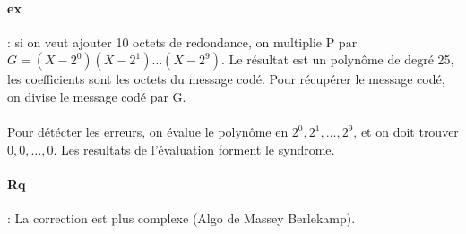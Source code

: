 \documentclass[10pt,a4paper]{article}
\begin{document}
	\paragraph{ex}: si on veut ajouter 10 octets de redondance, on multiplie P par $G = (X-2^0)(X-2^1)\ldots (X-2^9)$. Le résultat est un polynôme de degré 25, les coefficients sont les octets du message codé. Pour récupérer le message codé, on divise le message codé par G.
	\paragraph{} Pour détécter les erreurs, on évalue le polynôme en $2^0, 2^1, \ldots, 2^9$, et on doit trouver $0,0,\ldots,0$. Les resultats de l'évaluation forment le syndrome.
	\paragraph{Rq}: La correction est plus complexe (Algo de Massey Berlekamp).
	
\end{document}
